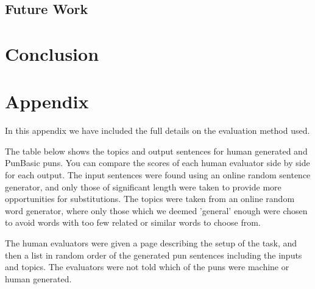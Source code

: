 \documentclass[11pt,letterpaper]{article}
\begin{document}
\subsection{Future Work}

\section{Conclusion}

\section{Appendix}

In this appendix we have included the full details on the evaluation method used.

The table below shows the topics and output sentences for human generated and PunBasic puns. You can compare the scores of each human evaluator side by side for each output. The input sentences were found using an online random sentence generator, and only those of significant length were taken to provide more opportunities for substitutions. The topics were taken from an online random word generator, where only those which we deemed 'general' enough were chosen to avoid words with too few related or similar words to choose from.

The human evaluators were given a page describing the setup of the task, and then a list in random order of the generated pun sentences including the inputs and topics. The evaluators were not told which of the puns were machine or human generated.
\end{document}
